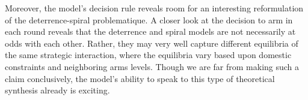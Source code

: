 \documentclass[12pt]{article}
\begin{document}
Moreover, the model's decision rule reveals room for an interesting reformulation of the deterrence-spiral problematique. A closer look at the decision to arm in each round reveals that the deterrence and spiral models are not necessarily at odds with each other. Rather, they may very well capture different equilibria of the same strategic interaction, where the equilibria vary based upon domestic constraints and neighboring arms levels. Though we are far from making such a claim conclusively, the model's ability to speak to this type of theoretical synthesis already is exciting.



\end{document}
